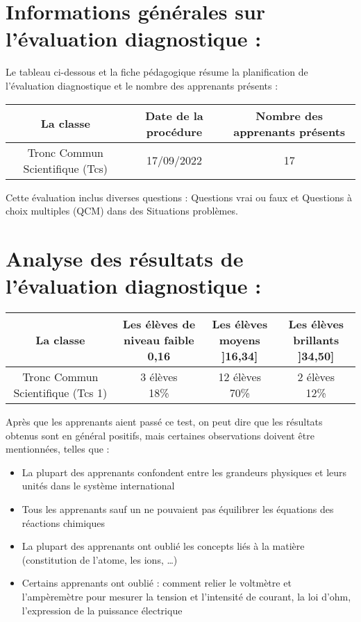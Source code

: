 \documentclass[12pt]{article}
\begin{document}
\section{Informations générales sur l’évaluation diagnostique :  }
Le tableau ci-dessous et la fiche pédagogique résume la planification de l’évaluation diagnostique et le nombre des apprenants présents :
\begin{center}
  \begin{tabular}{|c|c|c|}
	  \hline
	  La classe & Date de la procédure & Nombre des apprenants présents\\\hline
 Tronc Commun Scientifique (Tcs) & 17/09/2022 & 17\\\hline
\end{tabular}
\end{center}

Cette évaluation inclus diverses questions : Questions vrai ou faux et Questions à choix multiples (QCM) dans des Situations problèmes.
\section{Analyse des résultats de l’évaluation diagnostique : }

\begin{center}
  \begin{tabular}{|c|c|c|c|}
	  \hline
	  La classe & \makecell{Les élèves de niveau faible \\ 0,16 } & \makecell{Les élèves moyens \\ ]16,34]}& \makecell{Les élèves brillants \\  ]34,50]} \\\hline
Tronc Commun Scientifique (Tcs 1) & \makecell{3 élèves \\ 18\%} & \makecell{12 élèves \\ 70\%}& \makecell{2 élèves \\ 12\%} \\\hline
\end{tabular}
\end{center}

Après que les apprenants aient passé ce test, on peut dire que les résultats obtenus sont en général positifs, mais certaines observations doivent être mentionnées, telles que :

\begin{itemize}
	\item La plupart des apprenants confondent entre les grandeurs physiques et leurs unités dans le système international
	\item Tous les apprenants sauf un ne pouvaient pas équilibrer les équations des réactions chimiques

	\item La plupart des apprenants ont oublié les concepts liés à la matière (constitution de l’atome, les ions, …)
	\item Certains apprenants ont oublié : comment relier le voltmètre et l’ampèremètre pour mesurer la tension et l’intensité de courant,  la loi d’ohm, l’expression de la puissance électrique
\end{itemize}
\end{document}
